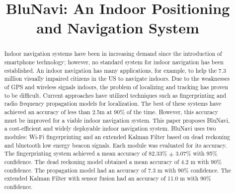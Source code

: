 \documentclass[conference]{IEEEtran}
\begin{document}
\title{BluNavi: An Indoor Positioning and Navigation System}

\author{
\and
{}
\and
{}
}

\maketitle

\begin{abstract}

Indoor navigation systems have been in increasing demand since the introduction of smartphone technology; however, no standard system for indoor navigation has been established. An indoor navigation has many applications, for example, to help the 7.3 million visually impaired citizens in the US to navigate indoors. Due to the weaknesses of GPS and wireless signals indoors, the problem of localizing and tracking has proven to be difficult. Current approaches have utilized techniques such as fingerprinting and radio frequency propagation models for localization. The best of these systems have achieved an accuracy of less than 2.5m at 90\% of the time. However, this accuracy must be improved for a viable indoor navigation system. This paper proposes BluNavi, a cost-efficient and widely deployable indoor navigation system. BluNavi uses two modules: Wi-Fi fingerprinting and an extended Kalman Filter based on dead reckoning and bluetooth low energy beacon signals. Each module was evaluated for its accuracy. The fingerprinting system achieved a mean accuracy of 82.33\% $\pm$ 3.07\% with 95\% confidence. The dead reckoning model obtained a mean accuracy of 4.2 m with 90\% confidence. The propagation model had an accuracy of 7.3 m with 90\% confidence. The extended Kalman Filter with sensor fusion had an accuracy of 11.0 m with 90\% confidence.

\end{abstract}
\end{document}
